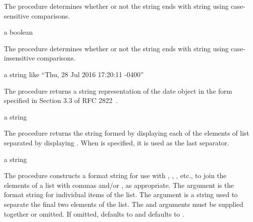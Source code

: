 The  procedure determines whether or not the string
 ends with string  using case-sensitive comparisons.

\begin{procedure}
\end{procedure}
\returns{} a boolean

The  procedure determines whether or not the
string  ends with string  using case-insensitive
comparisons.

\begin{procedure}
\end{procedure}
\returns{} a string like ``Thu, 28 Jul 2016 17:20:11 -0400''

The  procedure returns a string representation of
the date object  in the form specified in Section 3.3 of RFC
2822~\cite{RFC2822}.

\begin{procedure}
\end{procedure}
\returns{} a string

The  procedure returns the string formed by displaying each
of the elements of list  separated by displaying
. When  is specified, it is used as
the last separator.

\begin{procedure}
\end{procedure}
\returns{} a string

The  procedure constructs a format string for use with
, , , etc., to join the elements
of a list with commas and/or , as appropriate.
The  argument is the format string for individual
items of the list.
The  argument is a string used to separate the final two elements
of the list.
The  and  arguments must be supplied together or
omitted.
If omitted,  defaults to  and 
defaults to .

